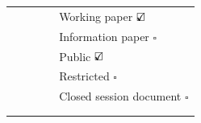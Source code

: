 \documentclass[english,11pt,a4paper,final,twoside,titlepage,pdftex]{article}
\title{\ReportTitle}
\author{\ReportAuthor}
\newcommand\CheckBoxTick{$\text{\rlap{$\checkmark$}}\square$}
\newcommand\CheckBoxUntick{$\square$}
\begin{document}
  \raggedright
  \sloppy %


  \begin{center}
    \thispagestyle{firststyle}
    \vspace*{2cm}
    \large{\textbf{\ReportMeeting}}

    \vspace*{0.25cm}
    \large{\emph{\ReportLocation}}
		
    \vspace*{1cm}
    \large{\textbf{\ReportNumber}} \\
    \vspace*{0.5cm}	
    \huge{\ReportTitle} \\
    \vspace*{0.5cm}	
    \large{\ReportAuthor}
  \end{center}

  \begin{table}[H]
    \centering
    \begin{tabular}{|p{0.25\linewidth}|p{0.75\linewidth}|}
      \hline
      \textbf{\color{blue}{Document type}} & Working paper                            \CheckBoxTick   \\
                                           & Information paper                        \CheckBoxUntick \\
      \hline
      \textbf{\color{blue}{Distribution}}  & Public                                   \CheckBoxTick   \\
                                           & Restricted \footnotemark[1]              \CheckBoxUntick \\
                                           & Closed session document \footnotemark[2] \CheckBoxUntick \\
      \hline
      \multicolumn{2}{|l|}{\textbf{\color{blue}{Abstract}}} \\
      \hline
      \multicolumn{2}{|p{1.0\linewidth}|}{} \\
      \hline
    \end{tabular}%
  \end{table}
\end{document}
